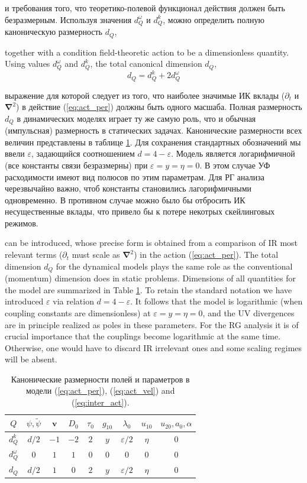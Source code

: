 \documentclass[12pt]{article}
\def\boldnabla{{\bm \nabla}}
\def\eps{\varepsilon}
\def\mv{{\bm v}}
\def\boldnabla{{\bm \nabla}}
\begin{document}
и требования того, что теоретико-полевой функционал действия должен быть безразмерным.
Используя значения $d^\omega_Q$ и $d_Q^k$, можно определить полную каноническую размерность $d_Q$,

together with a condition field-theoretic action to be a dimensionless quantity.
Using values $d^\omega_Q$ and $d_Q^k$,
the total canonical dimension $d_Q$,
\begin{equation}
   d_Q = d_Q^k + 2d_Q^\omega
\end{equation}

выражение для которой следует из того, что наиболее значимые ИК вклады ($\partial_t$ и $\boldnabla^2$) в действие (\ref{eq:act_per}) должны быть одного масшаба. 
Полная размерность $d_Q$ в динамических моделях играет ту же самую роль, что и обычная (импульсная) размерность в статических задачах.
Канонические размерности всех величин представлены в таблице \ref{tab:canon}.
Для сохранения стандартных обозначений мы ввели $\eps$, задающийся соотношением $d=4-\eps$.
Модель является логарифмичной (все константы связи безразмерны) при $\eps = y = \eta = 0$.
В этом случае УФ расходимости имеют вид полюсов по этим параметрам.
Для РГ анализа черезвычайно важно, чтоб константы становились лагорифмичными одновременно.
В противном случае можно было бы отбросить ИК несущественные вклады, что привело бы к потере некотрых скейлинговых режимов.

can be introduced,
whose precise form is obtained from a comparison of IR most
relevant terms ($\partial_t$ must scale as $\boldnabla^2$) in the action (\ref{eq:act_per}).
The total dimension $d_Q$ for the dynamical models
plays the same role as the conventional (momentum) dimension does in static problems.
Dimensions of all quantities for the model are summarized in Table \ref{tab:canon}.
To retain the standard notation we have introduced $\eps$ via relation $d=4-\eps$.
It follows that the model is logarithmic (when coupling constants
are dimensionless) at $\eps = y = \eta = 0$, and the UV divergences are
in principle realized as poles in these parameters. For the RG analysis it is
of crucial importance that the couplings become logarithmic at the same time. 
Otherwise, one would have to discard IR irrelevant ones and some scaling regimes
will be absent.
\begin{table}[h!]
 \centering
 \setlength\extrarowheight{5pt}
\begin{tabular}{| c | c | c | c | c| c | c | c | c | }
  \hline
  $Q$ & $\psi,\tilde{\psi}$ & ${\mv}$ & $D_0$ & $\tau_0$ & $g_{10}$ & $\lambda_0 $  
  & $u_{10}$  & $u_{20},a_0,\alpha$
 \\  \hline
  $d_Q^k$ & $d/2$ & $-1$ & $-2$ & $2$ & $y$ & $\eps/2$
  & $\eta$  & $0$ 
  \\  \hline
  $d^\omega_Q$ & 0 & $1$ & $1$ & $0$ & $0$ & $0$
  & $0$  & $0$ 
  \\  \hline
  $d_Q$ & $d/2$ & $1$ & $0$ & $2$ & $y$ & $\eps/2$
  & $\eta$  & $0$ 
  \\ \hline    
\end{tabular}
 \caption{Канонические размерности полей и параметров в модели (\ref{eq:act_per}), (\ref{eq:act_vel}) and (\ref{eq:inter_act}).  }
  \label{tab:canon}
\end{table}
\end{document}
